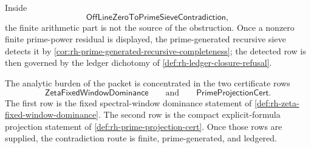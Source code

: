 \begin{principle}
\label{prin:rh-offline-zero-prime-sieve-finite-side-closed}
Inside
$$
\mathsf{OffLineZeroToPrimeSieveContradiction},
$$
the finite arithmetic part is not the source of the obstruction.  Once
a nonzero finite prime-power residual is displayed, the
prime-generated recursive sieve detects it by
\autoref{cor:rh-prime-generated-recursive-completeness}; the detected
row is then governed by the ledger dichotomy of
\autoref{def:rh-ledger-closure-refusal}.
\end{principle}

\begin{principle}
\label{prin:rh-offline-zero-prime-sieve-analytic-boundary}
The analytic burden of the packet is concentrated in the two certificate
rows
$$
\mathsf{ZetaFixedWindowDominance}
\qquad\text{and}\qquad
\mathsf{PrimeProjectionCert}.
$$
The first row is the fixed spectral-window dominance statement of
\autoref{def:rh-zeta-fixed-window-dominance}.  The second row is the
compact explicit-formula projection statement of
\autoref{def:rh-prime-projection-cert}.  Once those rows are supplied,
the contradiction route is finite, prime-generated, and ledgered.
\end{principle}
